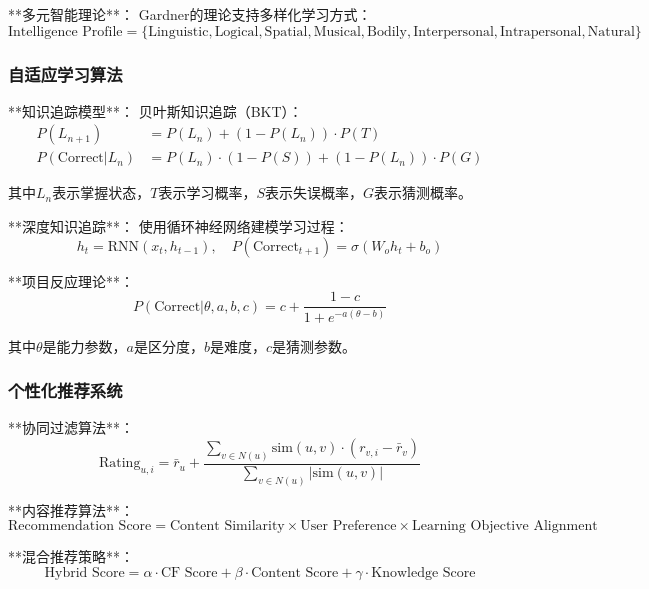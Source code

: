 **多元智能理论**：
Gardner的理论支持多样化学习方式：
\begin{equation}
\text{Intelligence Profile} = \{\text{Linguistic}, \text{Logical}, \text{Spatial}, \text{Musical}, \text{Bodily}, \text{Interpersonal}, \text{Intrapersonal}, \text{Natural}\}
\end{equation}

\subsubsection{自适应学习算法} %

**知识追踪模型**：
贝叶斯知识追踪（BKT）：
\begin{align}
P(L_{n+1}) &= P(L_n) + (1-P(L_n)) \cdot P(T) \\
P(\text{Correct}|L_n) &= P(L_n) \cdot (1-P(S)) + (1-P(L_n)) \cdot P(G)
\end{align}

其中$L_n$表示掌握状态，$T$表示学习概率，$S$表示失误概率，$G$表示猜测概率。

**深度知识追踪**：
使用循环神经网络建模学习过程：
\begin{equation}
h_t = \text{RNN}(x_t, h_{t-1}), \quad P(\text{Correct}_{t+1}) = \sigma(W_o h_t + b_o)
\end{equation}

**项目反应理论**：
\begin{equation}
P(\text{Correct}|\theta, a, b, c) = c + \frac{1-c}{1 + e^{-a(\theta - b)}}
\end{equation}

其中$\theta$是能力参数，$a$是区分度，$b$是难度，$c$是猜测参数。

\subsubsection{个性化推荐系统} %

**协同过滤算法**：
\begin{equation}
\text{Rating}_{u,i} = \bar{r}_u + \frac{\sum_{v \in N(u)} \text{sim}(u,v) \cdot (r_{v,i} - \bar{r}_v)}{\sum_{v \in N(u)} |\text{sim}(u,v)|}
\end{equation}

**内容推荐算法**：
\begin{equation}
\text{Recommendation Score} = \text{Content Similarity} \times \text{User Preference} \times \text{Learning Objective Alignment}
\end{equation}

**混合推荐策略**：
\begin{equation}
\text{Hybrid Score} = \alpha \cdot \text{CF Score} + \beta \cdot \text{Content Score} + \gamma \cdot \text{Knowledge Score}
\end{equation}

